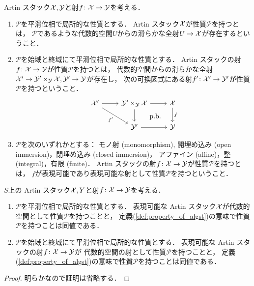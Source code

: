     \begin{Def}[\cite{SP} 03H8]\label{def:property_of_algst}
        Artin スタック$\mathcal{X},\mathcal{Y}$と射$f \colon \mathcal{X} \to \mathcal{Y}$を考える．
    \begin{enumerate}[label=(\roman*)]
    \item
        $\mathcal{P}$を平滑位相で局所的な性質とする．
        Artin スタック$\mathcal{X}$が性質$\mathcal{P}$を持つとは，
        $\mathcal{P}$であるような代数的空間$U$からの滑らかな全射$U \to \mathcal{X}$が存在するということ．
    \item
        $\mathcal{P}$を始域と終域にて平滑位相で局所的な性質とする．
        Artin スタックの射$f \colon \mathcal{X} \to \mathcal{Y}$が性質$\mathcal{P}$を持つとは，
        代数的空間からの滑らかな全射$\mathcal{X}' \to \mathcal{Y}' \times_{\mathcal{Y}} \mathcal{X}, \mathcal{Y}' \to \mathcal{Y}$が存在し，
        次の可換図式にある射$f' \colon \mathcal{X}' \to \mathcal{Y}'$が性質$\mathcal{P}$を持つということ．
        \[
        \begin{tikzcd}
            \stX' \ar[r] \ar[rd, "f'"']& \stY' \times_{\stY} \stX \ar[r]\ar[d]& \stX \ar[d, "f"]\\
            {} & \stY' \ar[r]& \stY \ar[lu, phantom, "\text{p.b.}"]
        \end{tikzcd}
        \]
    \item
        $\mathcal{P}$を次のいずれかとする：
        モノ射 (monomorphism), 開埋め込み (open immersion)，閉埋め込み (closed immersion)，
        アファイン (affine)，整 (integral)，有限 (finite)．
        Artin スタックの射$f \colon \mathcal{X} \to \mathcal{Y}$が性質$\mathcal{P}$を持つとは，
        $f$が表現可能であり表現可能な射として性質$\mathcal{P}$を持つということ．
    \end{enumerate}
    \end{Def}

    \begin{Lemma}
        $S$上の Artin スタック$\mathcal{X},Y$と射$f \colon \mathcal{X} \to \mathcal{Y}$を考える．
        \begin{enumerate}[label=(\roman*)]
        \item
            $\mathcal{P}$を平滑位相で局所的な性質とする．
            表現可能な Artin スタック$\mathcal{X}$が代数的空間として性質$\mathcal{P}$を持つことと，
            定義(\ref{def:property_of_algst})の意味で性質$\mathcal{P}$を持つことは同値である．
        \item
            $\mathcal{P}$を始域と終域にて平滑位相で局所的な性質とする．
            表現可能な Artin スタックの射$f \colon \mathcal{X} \to \mathcal{Y}$が
            代数的空間の射として性質$\mathcal{P}$を持つことと，
            定義(\ref{def:property_of_algst})の意味で性質$\mathcal{P}$を持つことは同値である．
        \end{enumerate}
    \end{Lemma}
    \begin{proof}
        明らかなので証明は省略する．
    \end{proof}

